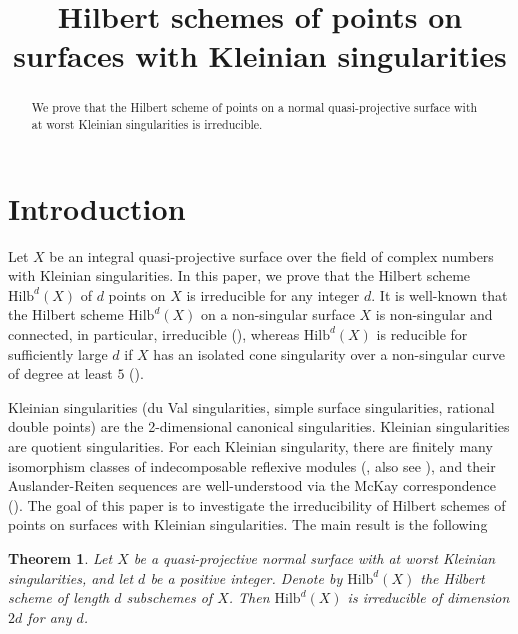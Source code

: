 \documentclass{amsart}[12pt]
\newtheorem{theorem}{Theorem}[section]
\theoremstyle{definition}
\theoremstyle{remark}
\numberwithin{equation}{section}
\begin{document}
\title{Hilbert schemes of points on surfaces with Kleinian singularities}

\author{%
}

\maketitle

\begin{abstract}
We prove that the Hilbert scheme of points on a normal quasi-projective surface with at worst Kleinian singularities is irreducible. 
\end{abstract}

\section{Introduction}

Let $X$ be an integral quasi-projective surface over the field of complex numbers with Kleinian singularities. In this paper, we prove that the Hilbert scheme $\mathrm{Hilb}^d(X)$ of $d$ points on $X$ is irreducible for any integer $d$. It is well-known that the Hilbert scheme $\mathrm{Hilb}^d(X)$ on a non-singular surface $X$ is non-singular and connected, in particular, irreducible (\cite[Proposition 2.3, Theorem 2.4]{F68}), whereas $\mathrm{Hilb}^d(X)$ is reducible for sufficiently large $d$ if $X$ has an isolated cone singularity over a non-singular curve of degree at least $5$ (\cite[Theorem 2.5]{MP13}). 

Kleinian singularities (du Val singularities, simple surface singularities, rational double points) are the 2-dimensional canonical singularities. Kleinian singularities are quotient singularities. For each Kleinian singularity, there are finitely many isomorphism classes of indecomposable reflexive modules (\cite{H78}, also see \cite[Proposition 2.1]{A86}), and their Auslander-Reiten sequences are well-understood via the McKay correspondence (\cite[Proposition 2.1, 3.2]{A86}). The goal of this paper is to investigate the irreducibility of Hilbert schemes of points on surfaces with Kleinian singularities. The main result is the following

\begin{theorem}\label{theorema}
Let $X$ be a quasi-projective normal surface with at worst Kleinian singularities, and let $d$ be a positive integer. Denote by $\mathrm{Hilb}^d(X)$ the Hilbert scheme of length $d$ subschemes of $X$. Then $\mathrm{Hilb}^d(X)$ is irreducible of dimension $2d$ for any $d$.
\end{theorem}
\end{document}
